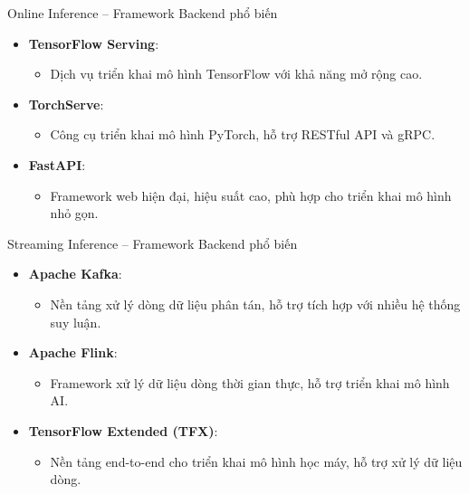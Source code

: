 \documentclass{beamer}
\begin{document}
\begin{frame}{Online Inference – Framework Backend phổ biến}
    \begin{itemize}
        \item \textbf{TensorFlow Serving}:
        \begin{itemize}
            \item Dịch vụ triển khai mô hình TensorFlow với khả năng mở rộng cao.
        \end{itemize}
        \item \textbf{TorchServe}:
        \begin{itemize}
            \item Công cụ triển khai mô hình PyTorch, hỗ trợ RESTful API và gRPC.
        \end{itemize}
        \item \textbf{FastAPI}:
        \begin{itemize}
            \item Framework web hiện đại, hiệu suất cao, phù hợp cho triển khai mô hình nhỏ gọn.
        \end{itemize}
    \end{itemize}
\end{frame}


\begin{frame}{Streaming Inference – Framework Backend phổ biến}
    \begin{itemize}
        \item \textbf{Apache Kafka}:
        \begin{itemize}
            \item Nền tảng xử lý dòng dữ liệu phân tán, hỗ trợ tích hợp với nhiều hệ thống suy luận.
        \end{itemize}
        \item \textbf{Apache Flink}:
        \begin{itemize}
            \item Framework xử lý dữ liệu dòng thời gian thực, hỗ trợ triển khai mô hình AI.
        \end{itemize}
        \item \textbf{TensorFlow Extended (TFX)}:
        \begin{itemize}
            \item Nền tảng end-to-end cho triển khai mô hình học máy, hỗ trợ xử lý dữ liệu dòng.
        \end{itemize}
    \end{itemize}
\end{frame}
\end{document}
